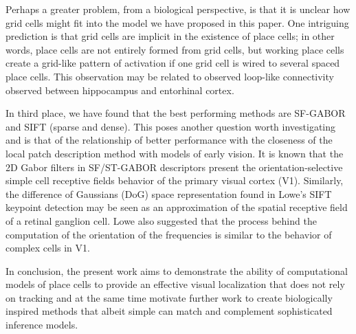 Perhaps a greater problem, from a biological perspective, is that it is unclear how grid cells might fit into the model we have proposed in this paper.  One intriguing prediction is that grid cells are implicit in the existence of place cells; in other words, place cells are not entirely formed from grid cells, but working place cells create a grid-like pattern of activation if one grid cell is wired to several spaced place cells.  This observation may be related to observed loop-like connectivity observed between hippocampus and entorhinal cortex. 

In third place, we have found that the best performing methods are SF-GABOR and SIFT (sparse and dense). This poses another question worth investigating and is that of the relationship of better performance with the closeness of the local patch description method with models of early vision. It is known that the 2D Gabor filters in SF/ST-GABOR descriptors present the orientation-selective simple cell receptive fields behavior of the primary visual cortex (V1). Similarly, the difference of Gaussians (DoG) space representation found in Lowe's SIFT keypoint detection may be seen as an approximation of the spatial receptive field of a retinal ganglion cell. Lowe also suggested that the process behind the computation of the orientation of the frequencies is similar to the behavior of complex cells in V1.


In conclusion, the present work aims to demonstrate the ability of computational models of place cells to provide an effective visual localization that does not rely on tracking and at the same time motivate further work to create biologically inspired methods that albeit simple can match and complement sophisticated inference models.

